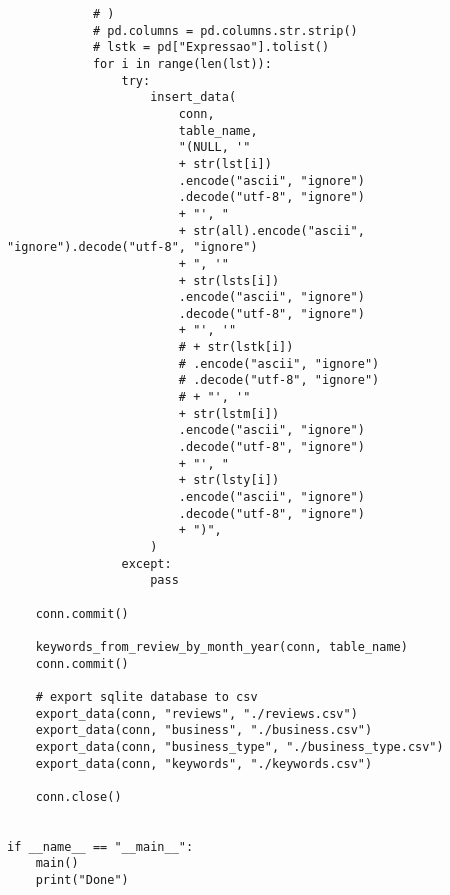 \begin{verbatim}
            # )
            # pd.columns = pd.columns.str.strip()
            # lstk = pd["Expressao"].tolist()
            for i in range(len(lst)):
                try:
                    insert_data(
                        conn,
                        table_name,
                        "(NULL, '"
                        + str(lst[i])
                        .encode("ascii", "ignore")
                        .decode("utf-8", "ignore")
                        + "', "
                        + str(all).encode("ascii", "ignore").decode("utf-8", "ignore")
                        + ", '"
                        + str(lsts[i])
                        .encode("ascii", "ignore")
                        .decode("utf-8", "ignore")
                        + "', '"
                        # + str(lstk[i])
                        # .encode("ascii", "ignore")
                        # .decode("utf-8", "ignore")
                        # + "', '"
                        + str(lstm[i])
                        .encode("ascii", "ignore")
                        .decode("utf-8", "ignore")
                        + "', "
                        + str(lsty[i])
                        .encode("ascii", "ignore")
                        .decode("utf-8", "ignore")
                        + ")",
                    )
                except:
                    pass

    conn.commit()

    keywords_from_review_by_month_year(conn, table_name)
    conn.commit()

    # export sqlite database to csv
    export_data(conn, "reviews", "./reviews.csv")
    export_data(conn, "business", "./business.csv")
    export_data(conn, "business_type", "./business_type.csv")
    export_data(conn, "keywords", "./keywords.csv")

    conn.close()


if __name__ == "__main__":
    main()
    print("Done")

\end{verbatim}